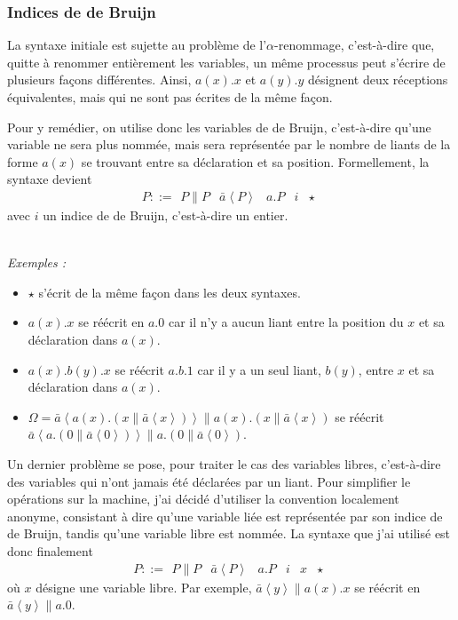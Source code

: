 \documentclass[11pt]{article}
\newcommand{\send}[2]{\bar{#1}\left\langle #2\right\rangle}
\newcounter{c_theo}
\newcounter{c_def}
\begin{document}
\subsubsection{Indices de de Bruijn}
\label{sec-1-2}

La syntaxe initiale est sujette au problème de l'$\alpha$-renommage, c'est-à-dire que, quitte à renommer entièrement les variables, un même processus peut s'écrire de plusieurs façons différentes. Ainsi, $a(x).x$ et $a(y).y$ désignent deux réceptions équivalentes, mais qui ne sont pas écrites de la même façon.

Pour y remédier, on utilise donc les variables de de Bruijn, c'est-à-dire qu'une variable ne sera plus nommée, mais sera représentée par le nombre de liants de la forme $a(x)$ se trouvant entre sa déclaration et sa position.
Formellement, la syntaxe devient
\[P::=\begin{array}{c|c|c|c|c}P\parallel P & \send{a}P & a.P & i & \star\end{array}\]
avec $i$ un indice de de Bruijn, c'est-à-dire un entier.

\textsl{\\Exemples :}
\begin{itemize}
	\item $\star$ s'écrit de la même façon dans les deux syntaxes.
	\item $a(x).x$ se réécrit en $a.0$ car il n'y a aucun liant entre la position du $x$ et sa déclaration dans $a(x)$.
	\item $a(x).b(y).x$ se réécrit $a.b.1$ car il y a un seul liant, $b(y)$, entre $x$ et sa déclaration dans $a(x)$.
	\item $\Omega = \send{a}{a(x).(x\parallel \send{a}x)} \parallel a(x).(x\parallel \send{a}x)$ se réécrit
	$\send{a}{a.(0\parallel \send{a}0)} \parallel a.(0\parallel \send{a}0)$.
\end{itemize}

Un dernier problème se pose, pour traiter le cas des variables libres, c'est-à-dire des variables qui n'ont jamais été déclarées par un liant.
Pour simplifier le opérations sur la machine, j'ai décidé d'utiliser la convention localement anonyme\cite{Chargueraud12}, consistant à dire qu'une variable liée est représentée par son indice de de Bruijn, tandis qu'une variable libre est nommée.
La syntaxe que j'ai utilisé est donc finalement
\[P::=\begin{array}{c|c|c|c|c|c}P\parallel P & \send{a}P & a.P & i & x & \star\end{array}\]
où $x$ désigne une variable libre.
Par exemple, $\send{a}y\parallel a(x).x$ se réécrit en $\send{a}y \parallel a.0$.
\end{document}
